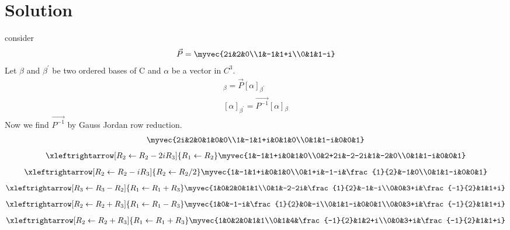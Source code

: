 \documentclass[journal,12pt,twocolumn]{IEEEtran}
\begin{document}
\section{Solution}
consider
\begin{align}
  \vec{P}=\myvec{2i&2&0\\1&-1&1+i\\0&1&1-i}
\end{align}
Let $\beta$ and $\beta^{'}$ be two ordered bases of C and $\alpha$ be  a vector in $C^{3}$. 
\begin{align}
    [\alpha]{_\beta}=\vec{P} [\alpha]{_{\beta^{'}}}\\
     [\alpha]{_{\beta^{'}}}=\vec{P^{-1}}[\alpha]{_\beta}
\end{align}
 Now we find $\vec{P^{-1}}$ by Gauss Jordan row reduction.
\begin{align}
    \myvec{2i&2&0&1&0&0\\1&-1&1+i&0&1&0\\0&1&1-i&0&0&1}
\end{align}
\begin{align}
    \xleftrightarrow[R_2\leftarrow R_2-2iR_3]{R_1\leftarrow R_2}\myvec{1&-1&1+i&0&1&0\\0&2+2i&-2-2i&1&-2&0\\0&1&1-i&0&0&1}
\end{align}
\begin{align}
    \xleftrightarrow[R_2\leftarrow R_2-iR_3]{R_2\leftarrow R_2/2}\myvec{1&-1&1+i&0&1&0\\0&1+i&-1-i&\frac{1}{2}&-1&0\\0&1&1-i&0&0&1}
\end{align}
\begin{align}
\xleftrightarrow[R_3\leftarrow R_3-R_2]{R_1\leftarrow R_1+R_3}\myvec{1&0&2&0&1&1\\0&1&-2-2i&\frac{1}{2}&-1&-i\\0&0&3+i&\frac{-1}{2}&1&1+i}
\end{align}
\begin{align}
\xleftrightarrow[R_2\leftarrow R_2+R_3]{R_1\leftarrow R_1-R_3}\myvec{1&0&-1-i&\frac{1}{2}&0&-i\\0&1&1-i&0&0&1\\0&0&3+i&\frac{-1}{2}&1&1+i}
\end{align}
\begin{align}
\xleftrightarrow[R_2\leftarrow R_2+R_3]{R_1\leftarrow R_1+R_3}\myvec{1&0&2&0&1&1\\0&1&4&\frac{-1}{2}&1&2+i\\0&0&3+i&\frac{-1}{2}&1&1+i}
\end{align}
\end{document}
